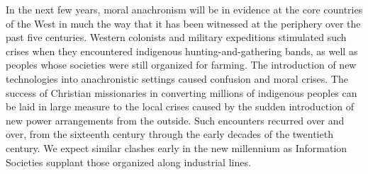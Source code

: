 \begin{paracol}{2}[]
\switchcolumn
In the next few years, moral anachronism will be in evidence at the core countries of the West in much the way that it has been witnessed at the periphery over the past five centuries. Western colonists and military expeditions stimulated such crises when they encountered indigenous hunting-and-gathering bands, as well as peoples whose societies were still organized for farming. The introduction of new technologies into anachronistic settings caused confusion and moral crises. The success of Christian missionaries in converting millions of indigenous peoples can be laid in large measure to the local crises caused by the sudden introduction of new power arrangements from the outside. Such encounters recurred over and over, from the sixteenth century through the early decades of the twentieth century. We expect similar clashes early in the new millennium as Information Societies supplant those organized along industrial lines.
\end{paracol}

